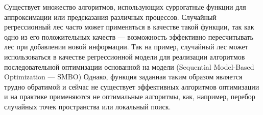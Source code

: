 \documentclass[pscyr]{itmo-student-thesis}
\begin{document}





\tableofcontents

\startprefacepage

Существует множество алгоритмов, использующих суррогатные функции для
аппроксимации или предсказания различных процессов. Случайный регрессионный лес
часто может применяться в качестве такой функции, так как одно из его
положительных качеств --- возможность эффективно пересчитывать лес при
добавлении новой информации. Так на пример, случайный лес может использоваться
в качестве регрессионной модели для реализации алгоритмов последовательной
оптимизации основанной на модели (Sequential Model-Based Optimization ---
SMBO\cite{smac}) Однако, функция заданная таким образом является трудно обратимой
и сейчас не существует эффективных алгоритмов оптимизации и на практике
применяются не оптимальные алгоритмы, как, например, перебор случайных точек
пространства или локальный поиск.





\end{document}
